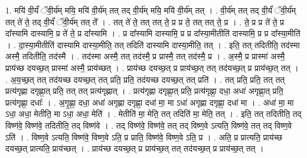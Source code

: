 \documentclass[17pt]{extarticle}
\begin{document}
1. मयि॑ वी॒र्यं॑ ॅवी॒र्य॑म् मयि॒ मयि॑ वी॒र्य॑म् तत् तद् वी॒र्य॑म् मयि॒ मयि॑ वी॒र्य॑म् तत् । . वी॒र्य॑म् तत् तद् वी॒र्यं॑ ॅवी॒र्य॑म् तत् ते॑ ते॒ तद् वी॒र्यं॑ ॅवी॒र्य॑म् तत् ते᳚ । . तत् ते॑ ते॒ तत् तत् ते॒ प्र प्र ते॒ तत् तत् ते॒ प्र । . ते॒ प्र प्र ते॑ ते॒ प्र दा᳚स्यामि दास्यामि॒ प्र ते॑ ते॒ प्र दा᳚स्यामि । . प्र दा᳚स्यामि दास्यामि॒ प्र प्र दा᳚स्या॒मीतीति॑ दास्यामि॒ प्र प्र दा᳚स्या॒मीति॑ । . दा॒स्या॒मीतीति॑ दास्यामि दास्या॒मीति॒ तत् तदिति॑ दास्यामि दास्या॒मीति॒ तत् । . इति॒ तत् तदितीति॒ तद॑स्मा अस्मै॒ तदितीति॒ तद॑स्मै । . तद॑स्मा अस्मै॒ तत् तद॑स्मै॒ प्र प्रास्मै॒ तत् तद॑स्मै॒ प्र । . अ॒स्मै॒ प्र प्रास्मा॑ अस्मै॒ प्राय॑च्छ दयच्छ॒त् प्रास्मा॑ अस्मै॒ प्राय॑च्छत् । . प्राय॑च्छ दयच्छ॒त् प्र प्राय॑च्छ॒त् तत् तद॑यच्छ॒त् प्र प्राय॑च्छ॒त् तत् । . अ॒य॒च्छ॒त् तत् तद॑यच्छ दयच्छ॒त् तत् प्रति॒ प्रति॒ तद॑यच्छ दयच्छ॒त् तत् प्रति॑ । . तत् प्रति॒ प्रति॒ तत् तत् प्रत्य॑गृह्णा दगृह्णा॒त् प्रति॒ तत् तत् प्रत्य॑गृह्णात् । . प्रत्य॑गृह्णा दगृह्णा॒त् प्रति॒ प्रत्य॑गृह्णा॒ दधा॒ अधा॑ अगृह्णा॒त् प्रति॒ प्रत्य॑गृह्णा॒ दधाः᳚ । . अ॒गृ॒ह्णा॒ दधा॒ अधा॑ अगृह्णा दगृह्णा॒ दधा॑ मा॒ मा ऽधा॑ अगृह्णा दगृह्णा॒ दधा॑ मा । . अधा॑ मा॒ मा ऽधा॒ अधा॒ मेतीति॒ मा ऽधा॒ अधा॒ मेति॑ । . मेतीति॑ मा॒ मेति॒ तत् तदिति॑ मा॒ मेति॒ तत् । . इति॒ तत् तदितीति॒ तद् विष्ण॑वे॒ विष्ण॑वे॒ तदितीति॒ तद् विष्ण॑वे । . तद् विष्ण॑वे॒ विष्ण॑वे॒ तत् तद् विष्ण॒वे ऽत्यति॒ विष्ण॑वे॒ तत् तद् विष्ण॒वे ऽति॑ । . विष्ण॒वे ऽत्यति॒ विष्ण॑वे॒ विष्ण॒वे ऽति॒ प्र प्राति॒ विष्ण॑वे॒ विष्ण॒वे ऽति॒ प्र । . अति॒ प्र प्रात्यति॒ प्राय॑च्छ दयच्छ॒त् प्रात्यति॒ प्राय॑च्छत् । . प्राय॑च्छ दयच्छ॒त् प्र प्राय॑च्छ॒त् तत् तद॑यच्छ॒त् प्र प्राय॑च्छ॒त् तत् । \newline
\end{document}
